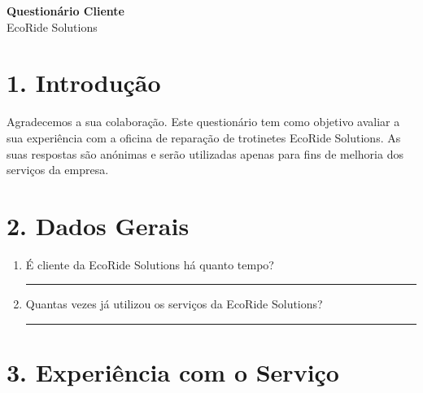 \documentclass[11pt,a4paper]{article}
\begin{document}
{\noindent\LARGE\bfseries\color{primaryblue} Questionário Cliente}
\\[0.3cm]
{\fontsize{16pt}{18pt}\selectfont EcoRide Solutions}


\section*{1. Introdução}

Agradecemos a sua colaboração. Este questionário tem como objetivo avaliar a sua experiência com a oficina de reparação de trotinetes EcoRide Solutions. As suas respostas são anónimas e serão utilizadas apenas para fins de melhoria dos serviços da empresa.

\vspace{0.5cm}

\section*{2. Dados Gerais}

\begin{enumerate}[leftmargin=*]

\item É cliente da EcoRide Solutions há quanto tempo? \\
\rule{\textwidth}{0.4pt}

\item Quantas vezes já utilizou os serviços da EcoRide Solutions? \\
\rule{\textwidth}{0.4pt}

\end{enumerate}

\vspace{0.5cm}

\section*{3. Experiência com o Serviço}
\end{document}
